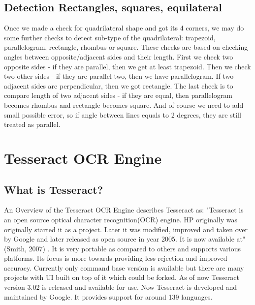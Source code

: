 \subsection{Detection Rectangles, squares, equilateral}
Once we made a check for quadrilateral shape and got its 4 corners, we may do some further checks to detect sub-type of the quadrilateral: trapezoid, parallelogram, rectangle, rhombus or square. These checks are based on checking angles between opposite/adjacent sides and their length. First we check two opposite sides - if they are parallel, then we get at least trapezoid. Then we check two other sides - if they are parallel two, then we have parallelogram. If two adjacent sides are perpendicular, then we got rectangle. The last check is to compare length of two adjacent sides - if they are equal, then parallelogram becomes rhombus and rectangle becomes square. And of course we need to add small possible error, so if angle between lines equals to 2 degrees, they are still treated as parallel. \cite{DetectingShape}
\section{Tesseract OCR Engine}
\subsection{What is Tesseract?}
An Overview of the Tesseract OCR Engine describes Tesseract as: "Tesseract is an open source
optical character recognition(OCR) engine. HP originally was originally started it as a project. Later it was modified, improved and taken over by Google and later released as open source
in year 2005. It is now available at" (Smith, 2007) . It is very portable as compared to others
and supports various platforms. Its focus is more towards providing less rejection and improved
accuracy. Currently only command base version is available but there are many projects with UI
built on top of it which could be forked. As of now Tesseract version 3.02 is released and
available for use. Now Tesseract is developed and maintained by Google. It provides support for
around 139 languages. \cite{TesseractORCEngine}
